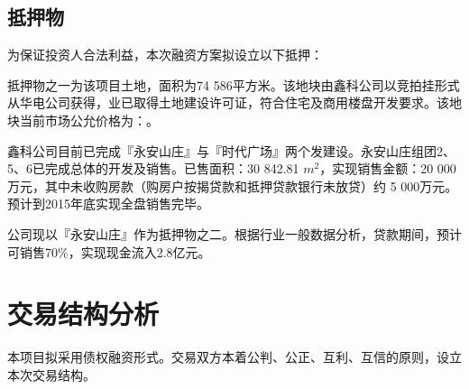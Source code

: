 \subsection{抵押物}
为保证投资人合法利益，本次融资方案拟设立以下抵押：
\begin{compactdesc}
\item[\color{main}{土地抵押}] 抵押物之一为该项目土地，面积为74 586平方米。该地块由鑫科公司以竞拍挂形式从华电公司获得，业已取得土地建设许可证，符合住宅及商用楼盘开发要求。该地块当前市场公允价格为：。
\item[\color{main}{项目抵押}] 鑫科公司目前已完成『永安山庄』与『时代广场』两个发建设。永安山庄组团2、5、6已完成总体的开发及销售。已售面积：30 842.81 $m^2$，实现销售金额：20 000万元，其中未收购房款（购房户按揭贷款和抵押贷款银行未放贷）约 5 000万元。预计到2015年底实现全盘销售完毕。

公司现以『永安山庄』作为抵押物之二。根据行业一般数据分析，贷款期间，预计可销售70\%，实现现金流入2.8亿元。
\end{compactdesc}

\section{交易结构分析}
本项目拟采用债权融资形式。交易双方本着公判、公正、互利、互信的原则，设立本次交易结构。
